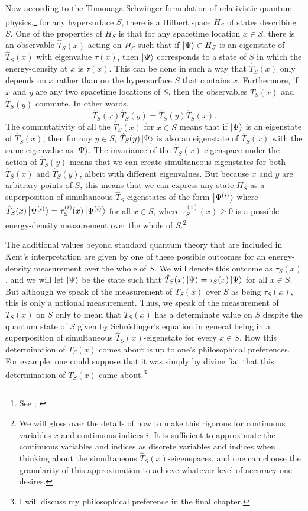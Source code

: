 Now according to the Tomonaga-Schwinger formulation of relativistic quantum physics,\footnote{See \cite{SchwingerJulianI}; \cite{TomonagaI}} for any hypersurface $S$, there is a Hilbert space $H_S$ of states describing $S$. One of the properties of $H_S$ is that for any spacetime location $x\in S$, there is an observable $\hat{T}_S(x)$ acting on $H_S$ such that if  $\ket{\Psi}\in H_S$ is an eigenstate of  $\hat{T}_S(x)$  with eigenvalue $\tau(x)$, then $\ket{\Psi}$ corresponds to a state of $S$ in which the energy-density at $x$ is $\tau(x)$. This can be done in such a way that $\hat{T}_S(x)$ only depends on $x$ rather than on the hypersurface $S$ that contains $x$. Furthermore, if $x$ and $y$ are any two spacetime locations of $S$, then the observables  $\hat{T}_S(x)$ and $\hat{T}_S(y)$ commute. In other words,
$$\hat{T}_S(x)\hat{T}_S(y)=\hat{T}_S(y)\hat{T}_S(x).$$
The commutativity of all the $\hat{T}_S(x)$ for $x\in S$ means that if $\ket{\Psi}$ is an eigenstate of $\hat{T}_S(x)$, then for any $y\in S$, $\hat{T}_S(y)\ket{\Psi}$ is also an eigenstate of  $\hat{T}_S(x)$ with the same eigenvalue as $\ket{\Psi}$. The invariance of the $\hat{T}_S(x)$-eigenspace under the action of   $\hat{T}_S(y)$ means that we can create simultaneous eigenstates for both  $\hat{T}_S(x)$ and  $\hat{T}_S(y)$, albeit with different eigenvalues. But because $x$ and $y$ are arbitrary points of $S$, this means that we can express any state $H_S$ as a superposition of simultaneous $\hat{T}_S$-eigenstates of the form $\ket{\Psi^{(i)}}$ where
  $\hat{T}_S(x)\ket{\Psi^{(i)}}=\tau^{(i)}_S(x)\ket{\Psi^{(i)}}$ for all $x\in S$, where $\tau^{(i)}_S(x)\geq 0$ is a possible energy-density measurement over the whole of $S$.\footnote{We will gloss over \label{glosssim}the details of how to make this rigorous for continuous variables $x$ and continuous indices $i$. It is sufficient to approximate the continuous variables and indices as discrete variables and indices when thinking about the simultaneous $\hat{T}_S(x)$-eigenspaces, and one can choose the granularity of this approximation to achieve whatever level of accuracy one desires.}\label{simultaneous}
  
The additional values beyond standard quantum theory that are included in Kent's interpretation are given by one of these possible outcomes for an energy-density measurement over the whole of $S$. We will denote this outcome as $\tau_S(x)$, and we will let $\ket{\Psi}$ be the state such that $\hat{T}_S(x)\ket{\Psi}=\tau_S(x)\ket{\Psi}$ for all $x\in S$. But although we speak of the measurement of $T_S(x)$ over $S$ as being $\tau_S(x)$, this is only a notional measurement. Thus, we speak of the measurement of  $T_S(x)$ on $S$ only to mean that $T_S(x)$ has a determinate value on $S$ despite the quantum state of $S$ given by Schr\"{o}dinger's equation in general being in a superposition of simultaneous $\hat{T}_S(x)$-eigenstate for every $x\in S$. How this determination of $T_S(x)$ comes about is up to one's philosophical preferences. For example, one could suppose that it was simply by divine fiat that this determination  of $T_S(x)$ came about.\footnote{I will discuss my philosophical preference in the final chapter.} 

